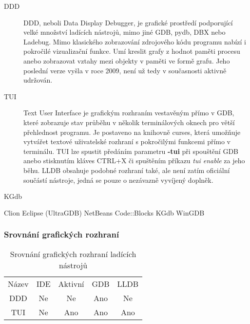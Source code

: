 \documentclass[bc,male,java,dept460]{diploma}						%
\begin{document}
		\begin{description}
			\item[DDD]
				DDD, neboli Data Display Debugger, je grafické prostředí podporující velké množství ladících nástrojů, mimo jiné GDB, pydb, DBX nebo Ladebug.
				Mimo klasického zobrazování zdrojového kódu programu nabízí i pokročilé vizualizační funkce. Umí kreslit grafy z hodnot paměti procesu
				anebo zobrazovat vztahy mezi objekty v paměti ve formě grafu. Jeho poslední verze vyšla v roce 2009, není už tedy v současnosti aktivně udržován.
			\item[TUI]
				Text User Interface je grafickým rozhraním vestavěným přímo v GDB, které zobrazuje stav průběhu v několik terminálových oknech pro větší přehlednost
				programu. Je postaveno na knihovně curses, která umožňuje vytvářet textové uživatelské rozhraní s pokročilými funkcemi přímo v terminálu. TUI lze
				spustit předáním parametru \textbf{-tui} při spouštění GDB anebo stisknutím kláves CTRL+X či spuštěním příkazu \emph{tui enable} za jeho běhu.
				LLDB obsahuje podobné rozhraní také, ale není zatím oficiální součástí nástroje, jedná se pouze o nezávazně vyvíjený doplněk.
			\item[KGdb]
				
		\end{description}
		Clion
		Eclipse (UltraGDB)
		NetBeans
		Code::Blocks
		KGdb
		WinGDB
		
		\subsubsection{Srovnání grafických rozhraní}
			\begin{table}
			\begin{tabular}{|c|c|c|c|c|}
				\hline
				Název 	& IDE & Aktivní	& GDB & LLDB 	\\
				DDD 		& Ne 	& Ne 			& Ano & Ne 		\\
				TUI 		& Ne 	& Ano 		& Ano & Ano		\\
				\hline
			\end{tabular}
			\caption{Srovnání grafických rozhraní ladících nástrojů}
			\label{tab:debugger-gui}
			\end{table}
\end{document}
